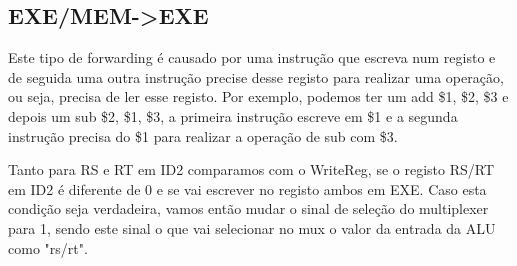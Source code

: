 \documentclass[pdftex,12pt,a4paper]{report}
\begin{document}
\subsection{EXE/MEM->EXE}

\begin{table}[!htb]
\centering
\label{my-label}
\end{table}

\begin{table}[!htb]
\centering
\label{for_ex_mem_exe}
\end{table}

Este tipo de forwarding é causado por uma instrução que escreva num registo e de seguida uma outra instrução precise desse registo para realizar uma operação, ou seja, precisa de ler esse registo. Por exemplo, podemos ter um add \$1, \$2, \$3 e depois um sub \$2, \$1, \$3, a primeira instrução escreve em \$1 e a segunda instrução precisa do \$1  para realizar a operação de sub com \$3.
\linebreak

Tanto para RS e RT em ID2 comparamos com o WriteReg, se o registo RS/RT em ID2 é diferente de 0 e se vai escrever no registo ambos em EXE. 
Caso esta condição seja verdadeira, vamos então mudar o sinal de seleção do multiplexer para 1, sendo este sinal o que vai selecionar no mux o valor da entrada da ALU como "rs/rt".
\end{document}

